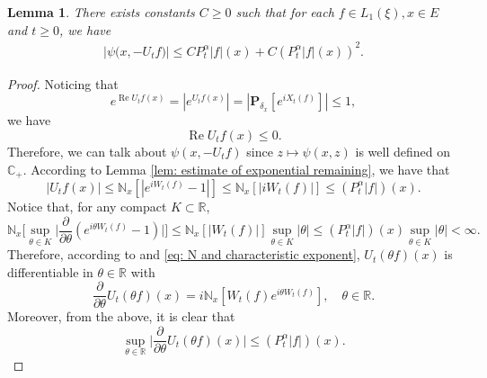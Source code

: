 \documentclass[12pt,a4paper]{amsart}
\theoremstyle{plain}
\newtheorem{lem}[thm]{Lemma}
\theoremstyle{definition}
\numberwithin{equation}{section}
\begin{document}
\begin{lem}
    There exists constants $C\geq 0$ such that for each $f \in L_1(\xi),x\in E$ and $t\geq 0$, we have
\begin{equation}\begin{split}
\label{eq: upper bound of psi(v)}
    \big|\psi\big(x,-U_tf\big)\big|
    \leq C P^\alpha_t |f|(x)+
     C (P^\alpha_t |f| (x))^2.
\end{split}\end{equation}
\end{lem}
\begin{proof}
     Noticing that
\[
     e^{\operatorname{Re} U_tf(x)}
    = |e^{U_tf(x)}|
    = |\mathbf P_{\delta_x}[e^{i X_t(f)}]|
    \leq 1,
\]
    we have
\begin{equation}
\label{eq: -v has positive real part}
 \operatorname{Re} U_tf(x)
    \leq 0.
\end{equation}
    Therefore, we can talk about $\psi(x,-U_tf)$ since $z\mapsto \psi(x,z)$ is well defined on $\mathbb C_+$.
    According to Lemma \ref{lem: estimate of exponential remaining}, we have that
\begin{equation}
\label{eq: upper bound for vf}
    |U_tf(x)| \leq \mathbb N_x[|e^{i W_t(f)} - 1|]
    \leq \mathbb N_x[|i W_t(f)|]
  \leq (P^\alpha_t |f|)(x).
\end{equation}
    Notice that, for any compact $K \subset \mathbb R$,
\begin{equation}
\label{eq: estimate of deriavetive of v(theta)}
    \mathbb N_x\Big[\sup_{\theta \in K} \Big|\frac{\partial}{\partial \theta} (e^{i\theta W_t(f)} - 1) \Big|\Big]
    \leq \mathbb N_x[|W_t(f)|] \sup_{\theta \in K}|\theta|
    \leq (P^\alpha_t |f|)(x) \sup_{\theta \in K}|\theta| < \infty.
\end{equation}
    Therefore, according to \cite[Theorem A.5.2.]{Durrett2010Probability} and \eqref{eq: N and characteristic exponent},
    $U_t(\theta f)(x)$ is differentiable in $\theta \in \mathbb R$ with
\[
    \frac{\partial}{\partial \theta} U_t(\theta f)(x)
    = i\mathbb N_x[W_t(f)e^{i\theta W_t(f)}],
    \quad \theta \in \mathbb R.
\]
    Moreover, from the above, it is clear that
\begin{equation}
\label{eq: upper bounded for derivative of v(theta)}
    \sup_{\theta \in \mathbb R}\Big| \frac{\partial}{\partial \theta}U_t(\theta f)(x)\Big|
    \leq ( P^\alpha_t |f|)(x).

\end{equation}
\end{proof}
\end{document}
